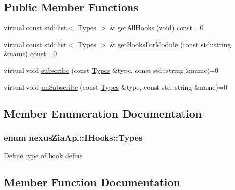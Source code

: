 \subsection*{Public Member Functions}
\begin{DoxyCompactItemize}
\item 
virtual const std\+::list$<$ \hyperlink{classnexusZiaApi_1_1IHooks_ab414a80fd9ed1c967916942ec5c20433}{Types} $>$ \& \hyperlink{classnexusZiaApi_1_1IHooks_a5e372c9b2564fad0f883657ebff2cc73}{get\+All\+Hooks} (void) const =0
\item 
virtual const std\+::list$<$ \hyperlink{classnexusZiaApi_1_1IHooks_ab414a80fd9ed1c967916942ec5c20433}{Types} $>$ \& \hyperlink{classnexusZiaApi_1_1IHooks_ab5e5eac6628b89fed36fcbc0586cfd88}{get\+Hooks\+For\+Module} (const std\+::string \&name) const =0
\item 
virtual void \hyperlink{classnexusZiaApi_1_1IHooks_a389e3429bc6e80f3583c5616e52dcfbe}{subscribe} (const \hyperlink{classnexusZiaApi_1_1IHooks_ab414a80fd9ed1c967916942ec5c20433}{Types} \&type, const std\+::string \&name)=0
\item 
virtual void \hyperlink{classnexusZiaApi_1_1IHooks_a9603e6d03b818729c1c1cf17a090bf0a}{un\+Subscribe} (const \hyperlink{classnexusZiaApi_1_1IHooks_ab414a80fd9ed1c967916942ec5c20433}{Types} \&type, const std\+::string \&name)=0
\end{DoxyCompactItemize}


\subsection{Member Enumeration Documentation}
\subsubsection[{\texorpdfstring{Types}{Types}}]{\setlength{\rightskip}{0pt plus 5cm}enum {\bf nexus\+Zia\+Api\+::\+I\+Hooks\+::\+Types}\hspace{0.3cm}{\ttfamily [strong]}}\hypertarget{classnexusZiaApi_1_1IHooks_ab414a80fd9ed1c967916942ec5c20433}{}\label{classnexusZiaApi_1_1IHooks_ab414a80fd9ed1c967916942ec5c20433}
\hyperlink{classDefine}{Define} type of hook define 

\subsection{Member Function Documentation}
